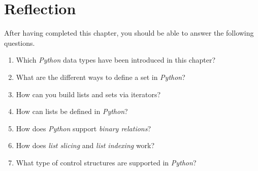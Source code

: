 \section{Reflection}
After having completed this chapter, you should be able to answer the following questions.
\begin{enumerate}
\item Which \textsl{Python} data types have been introduced in this chapter?
\item What are the different ways to define a set in \textsl{Python}?
\item How can you build lists and sets via iterators? 
\item How can lists be defined in \textsl{Python}?
\item How does \textsl{Python} support \emph{binary relations}?
\item How does \emph{list slicing} and \emph{list indexing} work?
\item What type of control structures are supported in \textsl{Python}?
\end{enumerate}


